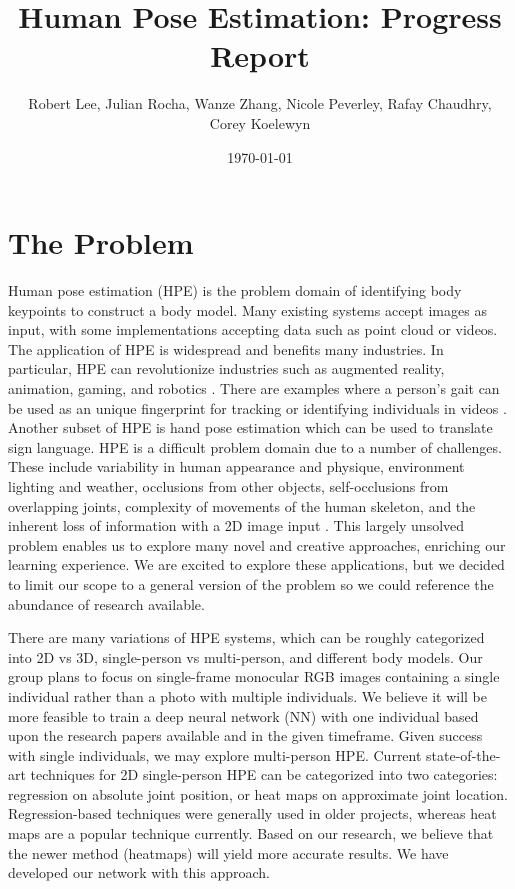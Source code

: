 \documentclass[11pt, letterpaper]{article}
\title{\textbf{Human Pose Estimation: Progress Report}}
\author{Robert Lee, Julian Rocha, Wanze Zhang, Nicole Peverley, Rafay Chaudhry, Corey Koelewyn}
\date{\today}
\begin{document}
\maketitle

\section{The Problem}

Human pose estimation (HPE) is the problem domain of identifying body keypoints to construct a body model. Many existing systems accept images as input, with some implementations accepting data such as point cloud or videos. The application of HPE is widespread and benefits many industries. In particular, HPE can revolutionize industries such as augmented reality, animation, gaming, and robotics \cite{fritz_ai_hpe}. There are examples where a person’s gait can be used as an unique fingerprint for tracking or identifying individuals in videos \cite{ZENG_2012_92}. Another subset of HPE is hand pose estimation which can be used to translate sign language. HPE is a difficult problem domain due to a number of challenges. These include variability in human appearance and physique, environment lighting and weather, occlusions from other objects, self-occlusions from overlapping joints, complexity of movements of the human skeleton, and the inherent loss of information with a 2D image input \cite{Sigal2014}. This largely unsolved problem enables us to explore many novel and creative approaches, enriching our learning experience. We are excited to explore these applications, but we decided to limit our scope to a general version of the problem so we could reference the abundance of research available.

There are many variations of HPE systems, which can be roughly categorized into 2D vs 3D, single-person vs multi-person, and different body models. Our group plans to focus on single-frame monocular RGB images containing a single individual rather than a photo with multiple individuals. We believe it will be more feasible to train a deep neural network (NN) with one individual based upon the research papers available and in the given timeframe. Given success with single individuals, we may explore multi-person HPE. Current state-of-the-art techniques for 2D single-person HPE can be categorized into two categories: regression on absolute joint position, or heat maps on approximate joint location. Regression-based techniques were generally used in older projects, whereas heat maps are a popular technique currently. Based on our research, we believe that the newer method (heatmaps) will yield more accurate results. We have developed our network with this approach.
\end{document}
